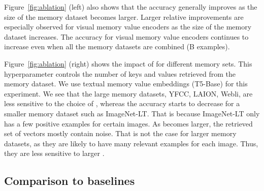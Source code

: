 Figure~\ref{fig:ablation} (left) also shows that the accuracy generally improves as the size of the memory dataset becomes larger. 
Larger relative improvements are especially observed for visual memory value encoders as the size of the memory dataset increases.
The accuracy for visual memory value encoders continues to increase even when all the memory datasets are combined (B examples). 

Figure~\ref{fig:ablation} (right) shows the impact of  for different memory sets.
This hyperparameter controls the number of keys and values retrieved from the memory dataset.
We use textual memory value embeddings (T5-Base) for this experiment.
We see that the large memory datasets, \eg YFCC, LAION, Webli, are less sensitive to the choice of , whereas the accuracy starts to decrease for a smaller memory dataset such as ImageNet-LT.
That is because ImageNet-LT only has a few positive examples for certain images.
As  becomes larger, the retrieved set of vectors mostly contain noise.
That is not the case for larger memory datasets, as they are likely to have many relevant examples for each image.
Thus, they are less sensitive to larger .

\subsection{Comparison to baselines}

